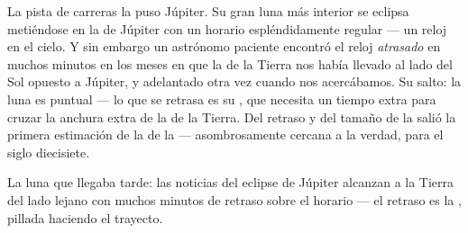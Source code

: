 \begin{example}\label{ex:g8:speed-of-light:romer}
La pista de carreras la puso Júpiter. Su gran luna más interior se
eclipsa metiéndose en la  de Júpiter con un horario
espléndidamente regular --- un reloj en el cielo. Y sin embargo un
astrónomo paciente encontró el reloj \emph{atrasado} en muchos minutos
en los meses en que la  de la Tierra nos había llevado al lado
del Sol opuesto a Júpiter, y adelantado otra vez cuando nos
acercábamos. Su salto: la luna es puntual --- lo que se retrasa es su
\emph{}, que necesita un tiempo extra para cruzar la anchura
extra de la  de la Tierra. Del retraso y del tamaño de la
 salió la primera estimación de la  de la
 --- asombrosamente cercana a la verdad, para el siglo
diecisiete.
\end{example}

\begin{omfigure}

{\small La luna que llegaba tarde: las noticias del eclipse de Júpiter
alcanzan a la Tierra del lado lejano con muchos minutos de retraso
sobre el horario --- el retraso es la , pillada haciendo el
trayecto.}
\end{omfigure}

